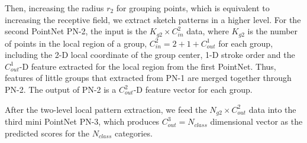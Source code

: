 Then, increasing the radius $r_2$ for grouping points, which is equivalent to increasing the receptive field, we extract sketch patterns in a higher level.
%
For the second PointNet PN-2, the input is the $K_{g2} \times C^2_{in}$ data, where $K_{g2}$ is the number of points in the local region of a group, $C^2_{in}=2+1+C^1_{out}$ for each group, including the 2-D local coordinate of the group center, 1-D stroke order and the $C^1_{out}$-D feature extracted for the local region from the first PointNet.
%
Thus, features of  little groups that extracted from PN-1 are merged together through PN-2.
%
The output of PN-2 is a $C^2_{out}$-D feature vector for each group.

\vspace{0.1cm}
After the two-level local pattern extraction, we feed the $N_{g2} \times C^2_{out}$ data into the third mini PointNet PN-3, which produces $C^{3}_{out}=N_{class}$ dimensional vector as the predicted scores for the $N_{class}$ categories.




